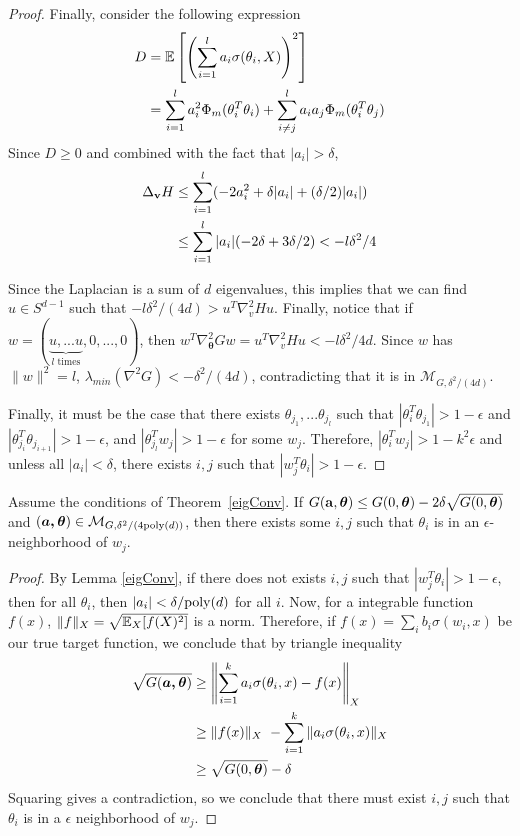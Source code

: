 \begin{proof}
Finally, consider the following expression
%
\begin{align*}
D & = \expt\left[\left( \sum_{i=1}^l a_i \sigma(\theta_i,X)\right)^2\right] \\
%
& =\sum_{i=1}^l a_i^2\Phi_m(\theta_i^T\theta_i) + \sum_{i \neq j}^l
  a_ia_j\Phi_m(\theta_i^T\theta_j)
\end{align*}
%
Since $D \geq 0$ and combined with the fact that $|a_i| > \delta$,
%
\begin{align*}
\Delta_{{\bf v}}H & \leq  \sum_{i=1}^l (-2a_i^2 +\delta |a_i|+(\delta/2)|a_i|) \\
& \leq   \sum_{i=1}^l  |a_i|(-2\delta + 3\delta/2) < -l\delta^2/4
\end{align*}

Since the Laplacian is a sum of $d$ eigenvalues, this implies that we can find $u \in S^{d-1}$ such that $-l\delta^2/(4d) > u^T\nabla^2_v H u$. Finally, notice that if $w = (\underbrace{u,...u}_{l {\textrm{ times}}},0,...,0)$, then $w^T\nabla^2_{\boldsymbol{\theta}} G w = u^T\nabla^2_v H u < -l\delta^2/4d$. Since $w$ has $\|w\|^2 = l$, $\lambda_{min}(\nabla^2 G) < -\delta^2/(4d)$, contradicting that it is in $\mathcal{M}_{G, \delta^2/(4d)}$. 

Finally, it must be the case that there exists $\theta_{j_1},...\theta_{j_l}$ such that
$|\theta_i^T\theta_{j_1}| > 1-\epsilon$ and
$|\theta_{j_{i}}^T\theta_{j_{i+1}}| > 1-\epsilon$, and
$|\theta_{j_l}^Tw_j| > 1-\epsilon$ for some $w_j$. Therefore,
$|\theta_i^Tw_j| > 1- k^2\epsilon$ and unless all $|a_i| <\delta$,  there exists $i, j$ such that $|w_j^T\theta_i| > 1-\epsilon$.
\end{proof}

\begin{lemma}\label{eigRes}
  Assume the conditions of Theorem~\ref{eigConv}. If
$G({\bf a, \boldsymbol{\theta}}) \leq G(0,\boldsymbol{\theta}) - 2\delta\sqrt{G(0,\boldsymbol{\theta})}$
  and $(\boldsymbol{a,\theta}) \in \mathcal{M}_{G,\delta^2/(4\mathrm{poly}(d))}$,
  then there exists some $i, j$ such that $\theta_i$ is in an
  $\epsilon$-neighborhood of $w_j$.
\end{lemma}
 
 \begin{proof}
   By Lemma \ref{eigConv}, if there does not exists $i, j$ such that
   $|w_j^T\theta_i| > 1-\epsilon$, then for all $\theta_i$, then
   $|a_i| < \delta/\mathrm{poly}(d)$ for all $i$. Now, for a integrable
   function $f(x)$, $\| f\|_X = \sqrt{\operatorname*{\mathbb{E}}_X[f(X)^2]}$ is a
   norm. Therefore, if $f(x) = \sum_i b_i \sigma(w_i,x)$ be our true
   target function, we conclude that by triangle inequality
\begin{align*}
\sqrt{G(\boldsymbol{a,\theta})}  & \geq \left\lVert \sum_{i=1}^k a_i \sigma(\theta_i,x) - f(x) \right\rVert_X \\
&\geq \|f(x)\|_X\ - \sum_{i=1}^k \|a_i\sigma(\theta_i,x) \|_X \\
& \geq
  \sqrt{G(0,\boldsymbol{\theta})} - \delta
\end{align*}
Squaring gives a contradiction, so we conclude that there must exist $i, j$ such that $\theta_i$ is in a $\epsilon$ neighborhood of $w_j$.
 \end{proof}
 
